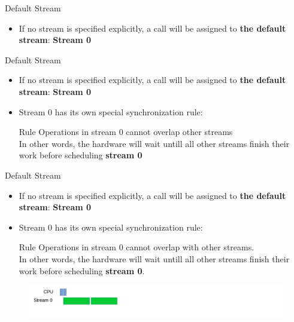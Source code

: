 \documentclass[9pt]{beamer}
\newcommand{\emphasize}[1]{\textbf{\color{red} #1 } }
\begin{document}
\begin{frame}[t]{Default Stream}
\begin{itemize}
\item If no stream is specified explicitly, a call will be assigned to \textbf{the default stream}: \emphasize{Stream 0}
\end{itemize}
\end{frame}

\begin{frame}[t]{Default Stream}
\begin{itemize}
\item If no stream is specified explicitly, a call will be assigned to \textbf{the default stream}: \emphasize{Stream 0}

\item Stream 0 has its own special synchronization rule:
\begin{alertblock}{Rule}
Operations in stream 0 cannot overlap other streams\\
In other words, the hardware will wait untill all other streams finish their work before scheduling \textbf{stream 0}
\end{alertblock}
\end{itemize}
\end{frame}

\begin{frame}[t]{Default Stream}
\begin{itemize}
\item If no stream is specified explicitly, a call will be assigned to \textbf{the default stream}: \emphasize{Stream 0}

\item Stream 0 has its own special synchronization rule:
\begin{alertblock}{Rule}
Operations in stream 0 cannot overlap with other streams.\\
In other words, the hardware will wait untill all other streams finish their work before scheduling \textbf{stream 0}.
\end{alertblock}
\end{itemize}

\begin{figure}
\includegraphics[scale=0.25]{images/ans-kernel-launch-1.jpg}
\centering
\end{figure}

\end{frame}
\end{document}
